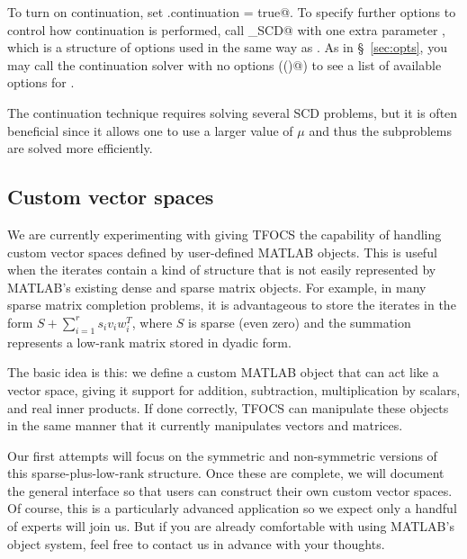 \documentclass{article}
\newcommand{\<}{\langle}
\renewcommand{\>}{\rangle}
\begin{document}
To turn on continuation, set \verb@opts.continuation = true@.
To specify further options to control how continuation is performed,
call \verb@tfocs_SCD@ with one extra parameter \verb@continuationOptions@,
which is a structure of options used in the same way as \verb@opts@.
As in \S~\ref{sec:opts}, you may call the continuation solver with no options
(\verb@continuation()@) to see a list of available options for \verb@continuationoOptions@.

The continuation technique requires solving several SCD problems, but it is often
beneficial since it allows one to use a larger value of $\mu$ and thus the subproblems
are solved more efficiently.


\subsection{Custom vector spaces}

We are currently experimenting with giving TFOCS the capability
of handling custom vector spaces defined by user-defined MATLAB
objects. This is useful when the iterates contain a kind of
structure that is not easily represented by MATLAB's existing
dense and sparse matrix objects. For example, in many sparse
matrix completion problems, it is
advantageous to store the iterates in the form $S+\sum_{i=1}^r s_i v_iw_i^T$,
where $S$ is sparse (even zero) and the summation represents
a low-rank matrix stored in dyadic form.

The basic idea is this: we define a custom MATLAB object
that can act like a vector space, giving it support for addition,
subtraction, multiplication by scalars, and real inner products.
If done correctly, TFOCS can manipulate these objects in the
same manner that it currently manipulates vectors and matrices.

Our first attempts will focus on the symmetric and non-symmetric
versions of this sparse-plus-low-rank structure. Once these are
complete, we will document the general interface so that users
can construct their own custom vector spaces. Of course, this 
is a particularly advanced application so we expect only a handful
of experts will join us. But if you are already comfortable with
using MATLAB's object system, feel free to contact us in advance
with your thoughts.
\end{document}
